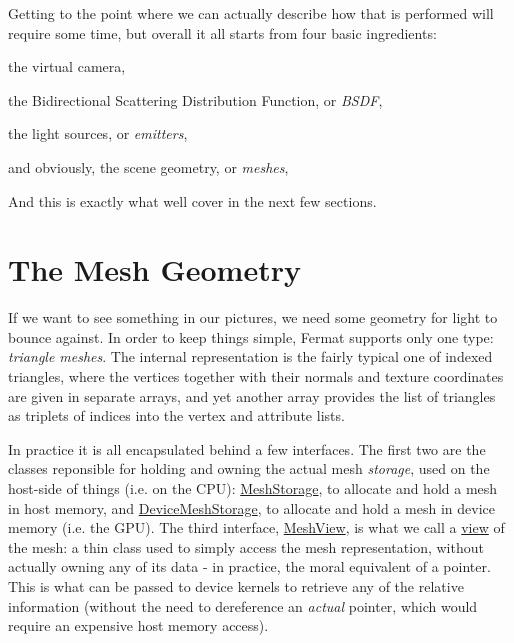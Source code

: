 \begin{DoxyParagraph}{}
Getting to the point where we can actually describe how that is performed will require some time, but overall it all starts from four basic ingredients\+: ~\newline

\begin{DoxyItemize}
\item the virtual camera,
\item the Bidirectional Scattering Distribution Function, or {\itshape B\+S\+DF},
\item the light sources, or {\itshape emitters},
\item and obviously, the scene geometry, or {\itshape meshes}, 
\end{DoxyItemize}
\end{DoxyParagraph}
\begin{DoxyParagraph}{}
And this is exactly what we\textquotesingle{}ll cover in the next few sections.
\end{DoxyParagraph}
\hypertarget{_overture_page_MeshesSection}{}\section{The Mesh Geometry}\label{_overture_page_MeshesSection}
\begin{DoxyParagraph}{}
If we want to see something in our pictures, we need some geometry for light to bounce against. In order to keep things simple, Fermat supports only one type\+: {\itshape triangle meshes}. The internal representation is the fairly typical one of indexed triangles, where the vertices together with their normals and texture coordinates are given in separate arrays, and yet another array provides the list of triangles as triplets of indices into the vertex and attribute lists. 
\end{DoxyParagraph}
\begin{DoxyParagraph}{}
In practice it is all encapsulated behind a few interfaces. The first two are the classes reponsible for holding and owning the actual mesh {\itshape storage}, used on the host-\/side of things (i.\+e. on the C\+PU)\+: \hyperlink{class_mesh_storage}{Mesh\+Storage}, to allocate and hold a mesh in host memory, and \hyperlink{class_device_mesh_storage}{Device\+Mesh\+Storage}, to allocate and hold a mesh in device memory (i.\+e. the G\+PU). The third interface, \hyperlink{struct_mesh_view}{Mesh\+View}, is what we call a \hyperlink{_fermat_host_device_page_FermatPlainViewsSection}{view} of the mesh\+: a thin class used to simply access the mesh representation, without actually owning any of its data -\/ in practice, the moral equivalent of a pointer. This is what can be passed to device kernels to retrieve any of the relative information (without the need to dereference an {\itshape actual} pointer, which would require an expensive host memory access). 
\end{DoxyParagraph}
